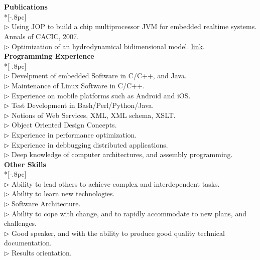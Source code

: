 \documentclass[letter,11pt,english]{article}
\begin{document}
\\
\\
{\bf Publications} \\*[-.8pc]
\underline{\hspace{6in}} \\
$\triangleright$ Using JOP to build a chip multiprocessor JVM for embedded realtime systems. Annals of CACIC, 2007.\\
$\triangleright$ Optimization of an hydrodynamical bidimensional model. \href{http://www.cimec.org.ar/ojs/index.php/mc/article/viewFile/2930/2867}{link}. \\

{\large \bf Programming Experience} \\*[-.8pc]
\underline{\hspace{6in}} \\
$\triangleright$ Develpment of embedded Software in C/C++, and Java.\\
$\triangleright$ Maintenance of Linux Software in C/C++.\\
$\triangleright$ Experience on mobile platforms such as Android and iOS.\\
$\triangleright$ Test Development in Bash/Perl/Python/Java.\\
$\triangleright$ Notions of Web Services, XML, XML schema, XSLT.\\
$\triangleright$ Object Oriented Design Concepts.\\
$\triangleright$ Experience in performance optimization.\\
$\triangleright$ Experience in debbugging distributed applications.\\
$\triangleright$ Deep knowledge of computer architectures, and assembly programming.\\


{\large \bf Other Skills} \\*[-.8pc]
\underline{\hspace{6in}} \\
$\triangleright$ Ability to lead others to achieve complex and interdependent tasks.\\
$\triangleright$ Ability to learn new technologies.\\
$\triangleright$ Software Architecture.\\
$\triangleright$ Ability to cope with change, and to rapidly accommodate to new plans, and challenges.\\
$\triangleright$ Good speaker, and with the ability to produce good quality technical documentation.\\
$\triangleright$ Results orientation.\\
\end{document}
